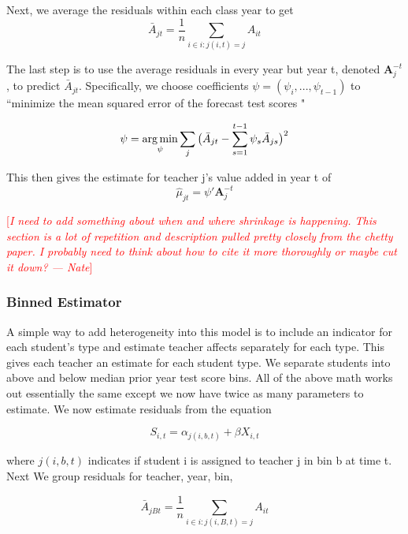\documentclass[12pt]{article}
\theoremstyle{definition}
\theoremstyle{definition}
\theoremstyle{definition}
\theoremstyle{definition}
\newcommand\cmnt[2]{\;
{\textcolor{red}{[{\em #1 --- #2}] \;}
}}
\newcommand\nate[1]{\cmnt{#1}{Nate}}
\begin{document}
    Next, we average the residuals within each class year to get 
    \begin{equation}
        \bar{A}_{jt} = \frac{1}{n} \sum_{i \in {i: j(i, t) = j}} A_{it}
    \end{equation}

    The last step is to use the average residuals in every year but year t, denoted $\mathbf{A}_j^{-t}$, to predict $\bar{A}_{jt} $. Specifically, we choose coefficients $\psi = (\psi_i, ..., \psi_{t-1})$ to ``minimize the mean squared error of the forecast test scores \citep{chetty2014measuring1}"

    \begin{equation}
        \psi = \operatorname*{arg\,min}_{\psi} \sum_j \big(  \bar{A}_{jt} - \sum_{s = 1}^{t-1} \psi_s \bar{A}_{js} \big)^2
    \end{equation}

    This then gives the estimate for teacher j's value added in year t of 
    \begin{equation}
        \hat{\mu}_{jt} = \psi'\mathbf{A}_j^{-t}
    \end{equation}

    \nate{I need to add something about when and where shrinkage is happening. This section is a lot of repetition and description pulled pretty closely from the chetty paper. I probably need to think about how to cite it more thoroughly or maybe cut it down? }

    \subsubsection{Binned Estimator}
    A simple way to add heterogeneity into this model is to include an indicator for each student's type and estimate teacher affects separately for each type. This gives each teacher an estimate for each student type. We separate students into above and below median prior year test score bins. All of the above math works out essentially the same except we now have twice as many parameters to estimate. We now estimate residuals from the equation

     \begin{equation}
        S_{i,t} = \alpha_{j(i,b, t)} + \beta X_{i, t}
    \end{equation}

    where $j(i,b, t)$ indicates if student i is assigned to teacher j in bin b at time t. Next We group residuals for teacher, year, bin, 

    \begin{equation}
        \bar{A}_{jBt} = \frac{1}{n} \sum_{i \in {i: j(i, B, t) = j}} A_{it}
    \end{equation}
\end{document}
